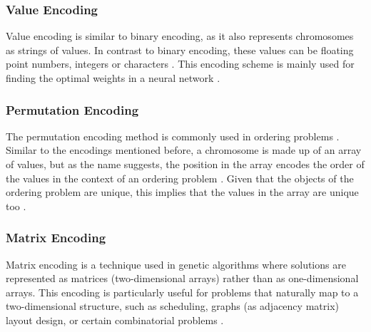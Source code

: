 \documentclass[sigconf]{acmart}
\begin{document}
\subsubsection{Value Encoding}
Value encoding is similar to binary encoding, as it also represents chromosomes
as strings of values. In contrast to binary encoding, these values can be
floating point numbers, integers or characters \cite{Katoch2021}.
This encoding scheme is mainly used for finding the optimal weights in a
neural network \cite{Katoch2021}.

\subsubsection{Permutation Encoding}
The permutation encoding method is commonly used in ordering problems
\cite{Katoch2021}. Similar to the encodings mentioned before, a chromosome
is made up of an array of values, but as the name suggests, the position in
the array encodes the order of the values in the context of an ordering problem
\cite{Katoch2021,Affenzeller2009}. Given that the objects of the ordering
problem are unique, this implies that the values in the array are unique too
\cite{Affenzeller2009}.

\subsubsection{Matrix Encoding}
Matrix encoding is a technique used in genetic algorithms where solutions are
represented as matrices (two-dimensional arrays) rather than as one-dimensional
arrays. This encoding is particularly useful for problems that
naturally map to a two-dimensional structure, such as scheduling, graphs
(as adjacency matrix) layout design, or certain combinatorial problems
\cite{Affenzeller2009}.



\end{document}
